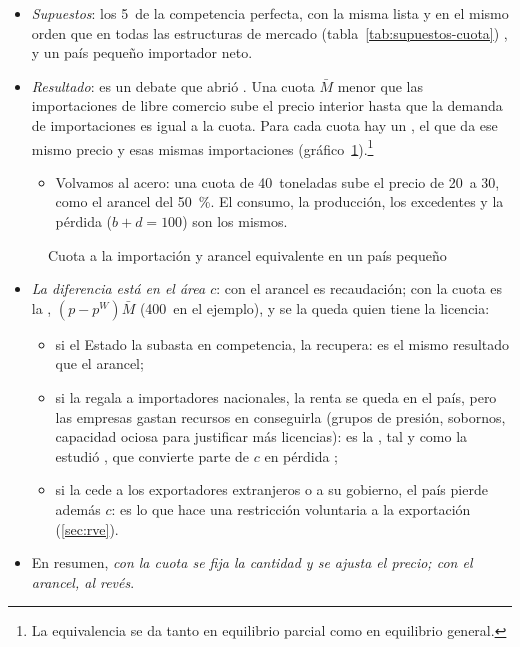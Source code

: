 \documentclass[11pt]{article}
\begin{document}
\begin{itemize}
\item \emph{Supuestos}: los 5~de la competencia perfecta, con la misma lista y en el mismo orden que en todas las estructuras de mercado (tabla~\ref{tab:supuestos-cuota}) , y un país pequeño importador neto.
\item \emph{Resultado}: es un debate que abrió \textcite{Bhagwati1965Equivalence}. Una cuota $\bar M$ menor que las importaciones de libre comercio sube el precio interior hasta que la demanda de importaciones es igual a la cuota. Para cada cuota hay un , el que da ese mismo precio y esas mismas importaciones (gráfico~\ref{fig:cuota}).\footnote{La equivalencia se da tanto en equilibrio parcial como en equilibrio general.}
  \begin{itemize}
  \item Volvamos al acero: una cuota de 40~toneladas sube el precio de 20~a 30, como el arancel del 50~\%. El consumo, la producción, los excedentes y la pérdida ($b+d=100$) son los mismos.
  \end{itemize}
\end{itemize}
\begin{figure}[H]
\centering
\caption{Cuota a la importación y arancel equivalente en un país pequeño}\label{fig:cuota}
\end{figure}
\begin{itemize}
\item \emph{La diferencia está en el área $c$}: con el arancel es recaudación; con la cuota es la , $(p-p^W)\bar M$ (400~en el ejemplo), y se la queda quien tiene la licencia:
  \begin{itemize}
  \item si el Estado la subasta en competencia, la recupera: es el mismo resultado que el arancel;
  \item si la regala a importadores nacionales, la renta se queda en el país, pero las empresas gastan recursos en conseguirla (grupos de presión, sobornos, capacidad ociosa para justificar más licencias): es la , tal y como la estudió \textcite{Krueger1974Political}, que convierte parte de $c$ en pérdida ;
  \item si la cede a los exportadores extranjeros o a su gobierno, el país pierde además $c$: es lo que hace una restricción voluntaria a la exportación (\ref{sec:rve}).
  \end{itemize}
\item En resumen, \emph{con la cuota se fija la cantidad y se ajusta el precio; con el arancel, al revés}.
\end{itemize}
\end{document}
